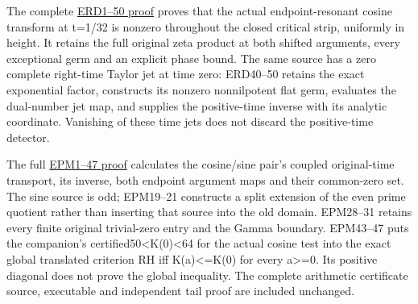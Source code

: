 \documentclass[
  10pt,
  a4paper,
]{article}
\begin{document}
The complete \href{ENDPOINT_RESONANT_ZERO_DETECTION.md}{ERD1--50 proof}
proves that the actual endpoint-resonant cosine transform at t=1/32 is
nonzero throughout the closed critical strip, uniformly in height. It
retains the full original zeta product at both shifted arguments, every
exceptional germ and an explicit phase bound. The same source has a zero
complete right-time Taylor jet at time zero: ERD40--50 retains the exact
exponential factor, constructs its nonzero nonnilpotent flat germ,
evaluates the dual-number jet map, and supplies the positive-time
inverse with its analytic coordinate. Vanishing of these time jets does
not discard the positive-time detector.

The full \href{ENDPOINT_PAIR_TRANSPORT_AND_WEIL_MATRIX.md}{EPM1--47
proof} calculates the cosine/sine pair's coupled original-time
transport, its inverse, both endpoint argument maps and their
common-zero set. The sine source is odd; EPM19--21 constructs a split
extension of the even prime quotient rather than inserting that source
into the old domain. EPM28--31 retains every finite original
trivial-zero entry and the Gamma boundary. EPM43--47 puts the
companion's certified50\textless K(0)\textless64 for the actual cosine
test into the exact global translated criterion RH iff
\textbar K(a)\textbar\textless=K(0) for every a\textgreater=0. Its
positive diagonal does not prove the global inequality. The complete
arithmetic certificate source, executable and independent tail proof are
included unchanged.
\end{document}
